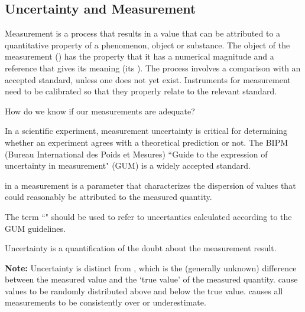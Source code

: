 \documentclass[12pt, a4paper, oneside, openright, titlepage]{book}
\begin{document}
\begin{appendices}
    
    \section{Uncertainty and Measurement}
    
    Measurement is a process that results in a value that can be attributed to a quantitative property of a phenomenon, object or substance. The object of the measurement () has the property that it has a numerical magnitude and a reference that gives its meaning (its ). The process involves a comparison with an accepted standard, unless one does not yet exist. Instruments for measurement need to be calibrated so that they properly relate to the relevant standard.

    \begin{qst}
        How do we know if our measurements are adequate? 
    \end{qst}

    In a scientific experiment, measurement uncertainty is critical for determining whether an experiment agrees with a theoretical prediction or not. The BIPM (Bureau International des Poids et Mesures) ``Guide to the expression of uncertainty in measurement" (GUM) is a widely accepted standard.

    \begin{defn}
         in a measurement is a parameter that characterizes the dispersion of values that could reasonably be attributed to the measured quantity.

        The term ``" should be used to refer to uncertanties calculated according to the GUM guidelines.
    \end{defn}

    Uncertainty is a quantification of the doubt about the measurement result. 

    \begin{rmk}
        \textbf{Note:} Uncertainty is distinct from , which is the (generally unknown) difference between the measured value and the `true value' of the measured quantity.  cause values to be randomly distributed above and below the true value.  causes all measurements to be consistently over or underestimate.
    \end{rmk}


\end{appendices}
\end{document}
